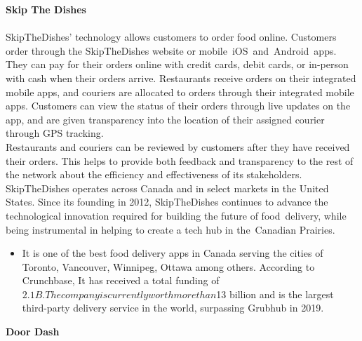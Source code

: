 \documentclass[12pt]{article}
\begin{document}
\textbf{Skip The Dishes
}\\
\\
SkipTheDishes' technology allows customers to order food online. Customers order through the SkipTheDishes website or mobile iOS and Android apps. They can pay for their orders online with credit cards, debit cards, or in-person with cash when their orders arrive. Restaurants receive orders on their integrated mobile apps, and couriers are allocated to orders through their integrated mobile apps. Customers can view the status of their orders through live updates on the app, and are given transparency into the location of their assigned courier through GPS tracking.
\\
Restaurants and couriers can be reviewed by customers after they have received their orders. This helps to provide both feedback and transparency to the rest of the network about the efficiency and effectiveness of its stakeholders.
\\
SkipTheDishes operates across Canada and in select markets in the United States. Since its founding in 2012, SkipTheDishes continues to advance the technological innovation required for building the future of food delivery, while being instrumental in helping to create a tech hub in the Canadian Prairies.
\begin{itemize}
\item It is one of the best food delivery apps in Canada serving the cities of Toronto, Vancouver, Winnipeg, Ottawa among others. According to Crunchbase, It has received a total funding of $2.1B. The company is currently worth more than $13 billion and is the largest third-party delivery service in the world, surpassing Grubhub in 2019. 

\end{itemize}


\textbf{Door Dash}
\end{document}
